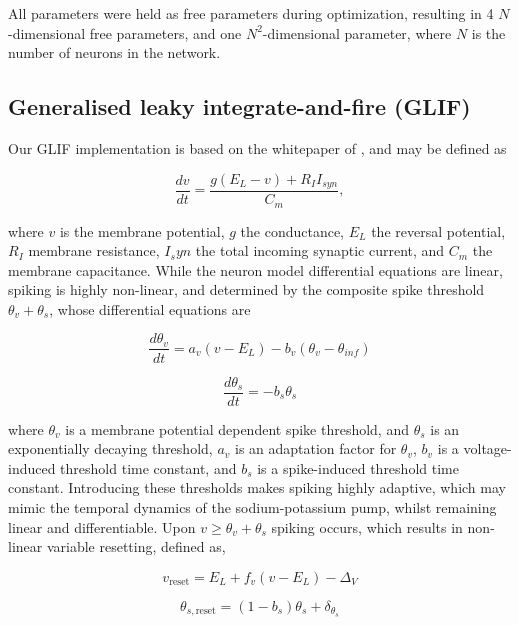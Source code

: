 \documentclass[mphil,deptreport,ai]{infthesis} %
\begin{document}
All parameters were held as free parameters during optimization, resulting in 4 $N$-dimensional free parameters, and one $N^2$-dimensional parameter, where $N$ is the number of neurons in the network. 


\subsection{Generalised leaky integrate-and-fire (GLIF)}

Our GLIF implementation is based on the whitepaper of \cite{allen_glif_white_paper}, and may be defined as

\begin{equation}
    \frac{dv}{dt} = \frac{g (E_L - v) + R_I I_{syn}}{C_m},
\end{equation}

where $v$ is the membrane potential, $g$ the conductance, $E_L$ the reversal potential, $R_I$ membrane resistance, $I_syn$ the total incoming synaptic current, and $C_m$ the membrane capacitance.
While the neuron model differential equations are linear, spiking is highly non-linear, and determined by the composite spike threshold $\theta_v + \theta_s$, whose differential equations are

\begin{equation}
    \frac{d\theta_v}{dt} = a_v (v - E_L) - b_v (\theta_v - \theta_{inf})
\end{equation}


\begin{equation}
    \frac{d\theta_s}{dt} = - b_s \theta_s
\end{equation}

where $\theta_v$ is a membrane potential dependent spike threshold, and $\theta_s$ is an exponentially decaying threshold, $a_v$ is an adaptation factor for $\theta_v$, $b_v$ is a voltage-induced threshold time constant, and $b_s$ is a spike-induced threshold time constant.
Introducing these thresholds makes spiking highly adaptive, which may mimic the temporal dynamics of the sodium-potassium pump, whilst remaining linear and differentiable.
Upon $v \geq \theta_v + \theta_s$ spiking occurs, which results in non-linear variable resetting, defined as,

\begin{equation}
    v_{\text{reset}} = E_L + f_v (v - E_L) - \Delta_V
\end{equation}

\begin{equation}
    \theta_{s,\text{reset}} = (1 - b_s) \theta_s + \delta_{\theta_s}
\end{equation}
\end{document}
